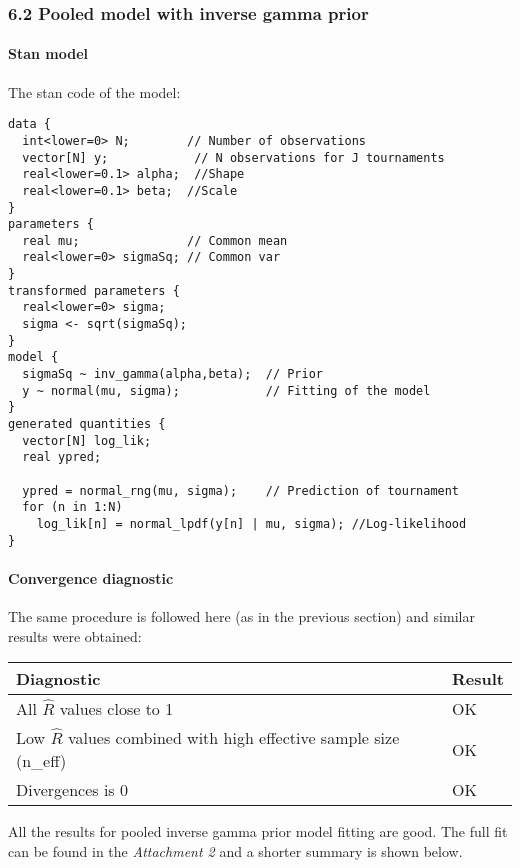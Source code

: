 \documentclass[11pt]{article}
\begin{document}
    \hypertarget{pooled-model-with-inverse-gamma-prior}{%
\subsubsection{6.2 Pooled model with inverse gamma
prior}\label{pooled-model-with-inverse-gamma-prior}}

\hypertarget{stan-model}{%
\paragraph{Stan model}\label{stan-model}}

The stan code of the model:

\begin{verbatim}
data {
  int<lower=0> N;        // Number of observations
  vector[N] y;            // N observations for J tournaments
  real<lower=0.1> alpha;  //Shape
  real<lower=0.1> beta;  //Scale
}
parameters {
  real mu;               // Common mean
  real<lower=0> sigmaSq; // Common var
}
transformed parameters {
  real<lower=0> sigma;
  sigma <- sqrt(sigmaSq);
}
model {
  sigmaSq ~ inv_gamma(alpha,beta);  // Prior
  y ~ normal(mu, sigma);            // Fitting of the model
}
generated quantities {
  vector[N] log_lik;
  real ypred;
  
  ypred = normal_rng(mu, sigma);    // Prediction of tournament
  for (n in 1:N)
    log_lik[n] = normal_lpdf(y[n] | mu, sigma); //Log-likelihood
}
\end{verbatim}

\hypertarget{convergence-diagnostic}{%
\paragraph{Convergence diagnostic}\label{convergence-diagnostic}}

The same procedure is followed here (as in the previous section) and
similar results were obtained:

\begin{longtable}[]{@{}ll@{}}
\toprule
Diagnostic & Result\tabularnewline
\midrule
\endhead
All \(\hat R\) values close to 1 & OK\tabularnewline
Low \(\hat R\) values combined with high effective sample size (n\_eff)
& OK\tabularnewline
Divergences is 0 & OK\tabularnewline
\bottomrule
\end{longtable}

All the results for pooled inverse gamma prior model fitting are good.
The full fit can be found in the \emph{Attachment 2} and a shorter
summary is shown below.
\end{document}
